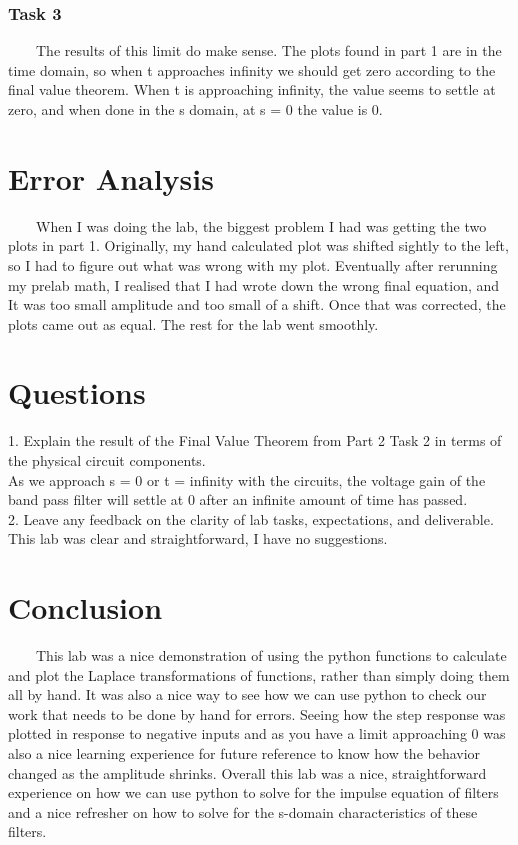 \documentclass[11pt,a4]{article}
\begin{document}
\subsubsection{Task 3}
\ \ \ \ The results of this limit do make sense. The plots found in part 1 are in the time domain, so when t approaches infinity we should get zero according to the final value theorem. When t is approaching infinity, the value seems to settle at zero, and when done in the s domain, at s = 0 the value is 0.

\section{Error Analysis}
\ \ \ \ When I was doing the lab, the biggest problem I had was getting the two plots in part 1. Originally, my hand calculated plot was shifted sightly to the left, so I had to figure out what was wrong with my plot. Eventually after rerunning my prelab math, I realised that I had wrote down the wrong final equation, and It was too small amplitude and too small of a shift. Once that was corrected, the plots came out as equal. The rest for the lab went smoothly.

\section{Questions}
1. Explain the result of the Final Value Theorem from Part 2 Task 2 in terms of the physical circuit components.\\
As we approach s = 0 or t = infinity with the circuits, the voltage gain of the band pass filter will settle at 0 after an infinite amount of time has passed.\\
2. Leave any feedback on the clarity of lab tasks, expectations, and deliverable.\\
This lab was clear and straightforward, I have no suggestions.

\section{Conclusion}
\ \ \ \ This lab was a nice demonstration of using the python functions to calculate and plot the Laplace transformations of functions, rather than simply doing them all by hand. It was also a nice way to see how we can use python to check our work that needs to be done by hand for errors. Seeing how the step response was plotted in response to negative inputs and as you have a limit approaching 0 was also a nice learning experience for future reference to know how the behavior changed as the amplitude shrinks. Overall this lab was a nice, straightforward experience on how we can use python to solve for the impulse equation of filters and a nice refresher on how to solve for the s-domain characteristics of these filters.
\end{document}
